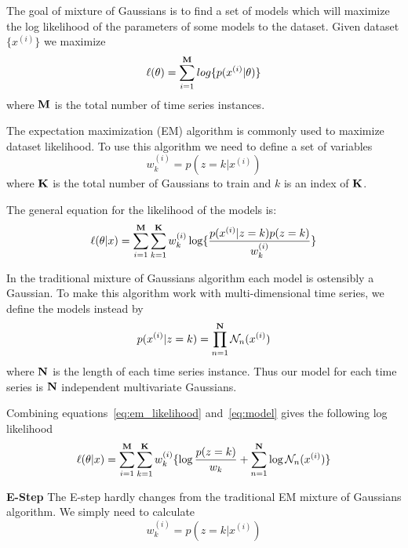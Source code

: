 The goal of mixture of Gaussians is to find a set of models which will maximize the log likelihood of the parameters of some models to the dataset.  Given dataset $\{x^{(i)}\}$ we maximize
\begin{equation}
\ell(\theta) = \sum_{i = 1}^{\bf M}log\{p(x^{(i)}|\theta)\}
\end{equation}
\noindent 
where ${\bf M}$ is the total number of time series instances.

The expectation maximization (EM) algorithm is commonly used to maximize dataset likelihood.  To use this algorithm we need to define a set of variables
\begin{equation}
w_{k}^{(i)} = p(z = k|x^{(i)})
\end{equation}
\noindent
where ${\bf K}$ is the total number of Gaussians to train and $k$ is an index of ${\bf K}$.  

The general equation for the likelihood of the models is: 
\begin{equation}
\label{eq:em_likelihood}
\ell(\theta|x) = \sum_{i = 1}^{{\bf M}}\sum_{k = 1}^{{\bf K}}w_{k}^{(i)}\log \{ \frac{p(x^{(i)}|z=k)p(z = k)}{w_{k}^{(i)}} \}
\end{equation}

In the traditional mixture of Gaussians algorithm each model is ostensibly a Gaussian.  To make this algorithm work with multi-dimensional time series, we define the models instead by
\begin{equation}
\label{eq:model}
p(x^{(i)}|z = k) = \prod_{n = 1}^{{\bf N}}\mathcal{N}_{n}(x^{(i)})
\end{equation}
\noindent
where ${\bf N}$ is the length of each time series instance.  Thus our model for each time series is ${\bf N}$ independent multivariate Gaussians.

Combining equations~\ref{eq:em_likelihood} and~\ref{eq:model} gives the following log likelihood
\begin{equation}
\label{eq:em_combined}
\ell(\theta|x) = \sum_{i = 1}^{{\bf M}}\sum_{k = 1}^{{\bf K}}w_{k}^{(i)}\{ \log\frac{p(z = k)}{w_{k}} + \sum_{n = 1}^{{\bf N}} \log \mathcal{N}_{n}(x^{(i)})\}
\end{equation}

\textbf{E-Step}
The E-step hardly changes from the traditional EM mixture of Gaussians algorithm.  We simply need to calculate 
\begin{equation}
w^{(i)}_{k} = p(z = k|x^{(i)})
\end{equation}

